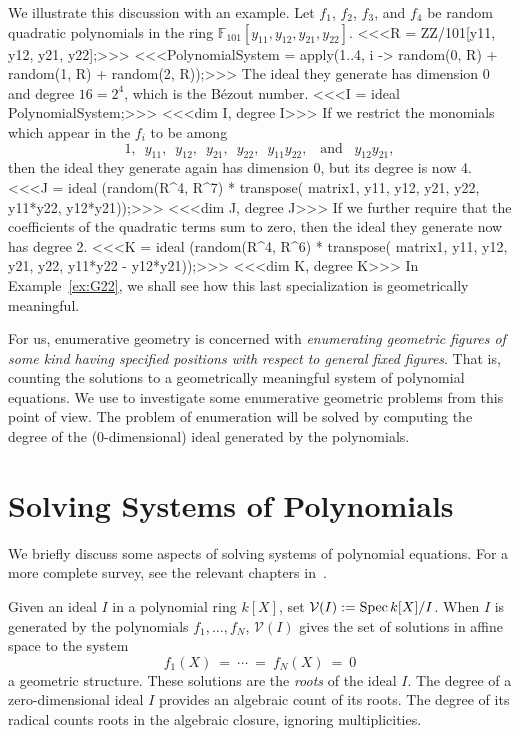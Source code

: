 \begin{example}\label{ex:one}
We illustrate this discussion with an example.
Let $f_1$, $f_2$, $f_3$, and $f_4$ be random quadratic polynomials in the ring  
${\mathbb F}_{101}[y_{11},y_{12},y_{21},y_{22}]$.
%
<<<R = ZZ/101[y11, y12, y21, y22];>>>
%
<<<PolynomialSystem = apply(1..4, i -> 
                random(0, R) + random(1, R) + random(2, R));>>>
%
The ideal they generate has dimension 0 and degree $16=2^4$, which is the
B\'ezout number. 
%
<<<I = ideal PolynomialSystem;>>>
%
<<<dim I, degree I>>>
%
If we restrict the monomials which appear in the $f_i$ to be among
$$
  1,\;\ y_{11},\;\ y_{12},\;\ y_{21},\;\ y_{22},\;\  
  y_{11}y_{22},\;\ \mbox{ and }\;\  y_{12}y_{21},
$$
then the ideal they generate again has dimension 0, but its degree is now 4.
%
<<<J = ideal (random(R^4, R^7) *  transpose(
        matrix{{1, y11, y12, y21, y22, y11*y22, y12*y21}}));>>>
%
<<<dim J, degree J>>>
%
If we further require that the coefficients of the
quadratic terms sum to zero, then the ideal they generate now 
has degree 2.
%
<<<K = ideal (random(R^4, R^6) * transpose( 
        matrix{{1, y11, y12, y21, y22, y11*y22 - y12*y21}}));>>>
%
<<<dim K, degree K>>>
%
In Example~\ref{ex:G22}, we shall see how this last specialization is
geometrically meaningful.
\end{example}


For us, enumerative geometry is concerned
with {\sl enumerating geometric figures of some kind having
specified positions with respect to general fixed figures}.
That is, counting the solutions to a geometrically meaningful
system of polynomial equations.
We use \Mtwo{}\/ to investigate some enumerative geometric
problems from this point of view.
The problem of enumeration will be solved by computing the
degree of the 
(0-dimensional) ideal generated by the polynomials.

\section{Solving Systems of Polynomials}
We briefly discuss some aspects of solving systems of polynomial
equations\index{solving polynomial equations}.
For a more complete survey, see the relevant chapters
in~\cite{SO:CCS,SO:CLO92}.

Given an ideal $I$ in a polynomial ring $k[X]$, set 
${\mathcal V}(I):= {\rm Spec}\,k[X]/I$.
When $I$ is generated by the polynomials
$f_1,\ldots,f_N$, ${\mathcal V}(I)$ gives the set of solutions in affine 
space to the system 
\begin{equation}\label{eq:system}
  f_1(X)\ =\ \cdots\ =\ f_N(X)\ =\ 0
\end{equation}
a geometric structure.
These solutions are the {\it roots} of the ideal $I$.
The degree of a zero-dimensional ideal $I$ provides an algebraic count of
its roots.
The degree of its radical counts 
roots in the algebraic closure, ignoring multiplicities.
          
